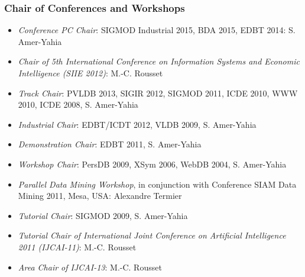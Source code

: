 \subsubsection*{Chair  of Conferences and Workshops}

\begin{itemize}
\setlength{\itemindent}{-0.5cm}
\setlength{\itemsep}{-0.1cm}

\item \emph{Conference PC Chair}: SIGMOD Industrial 2015, BDA 2015, EDBT 2014: S. Amer-Yahia

\item \emph{ Chair of 5th International Conference on Information Systems and Economic Intelligence (SIIE 2012)}: M.-C. Rousset

\item \emph{Track Chair}: PVLDB 2013, SIGIR 2012, SIGMOD 2011, ICDE 2010, WWW 2010, ICDE 2008, S. Amer-Yahia

\item \emph{Industrial Chair}: EDBT/ICDT 2012, VLDB 2009,  S. Amer-Yahia

\item \emph{Demonstration Chair}: EDBT 2011, S. Amer-Yahia

\item \emph{Workshop Chair}: PersDB 2009, XSym 2006, WebDB 2004, S. Amer-Yahia

\item \emph{Parallel Data Mining Workshop}, in conjunction with Conference SIAM Data Mining 2011,  Mesa, USA: Alexandre Termier  

\item \emph{Tutorial Chair}: SIGMOD 2009, S. Amer-Yahia

\item \emph{Tutorial Chair of International Joint Conference on Artificial Intelligence 2011 (IJCAI-11)}: M.-C. Rousset

\item \emph{Area Chair of IJCAI-13}: M.-C. Rousset
 
\end{itemize}
